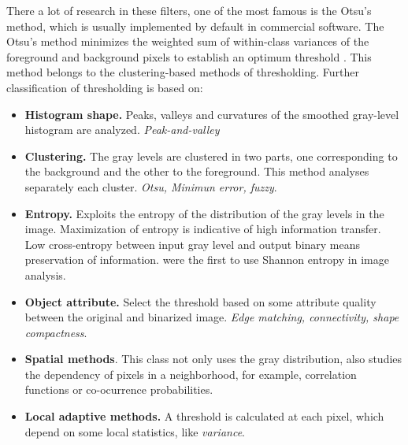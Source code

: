 There a lot of research in these filters, one of the most famous is the Otsu's
method, which is usually implemented by default in commercial software.
The Otsu's method minimizes the weighted sum of within-class variances of the
foreground and background pixels to establish an optimum threshold
\citep{sezgin_survey_2004}. This method belongs to the clustering-based methods
of thresholding. Further classification of thresholding is based on:
\begin{itemize}
  \item \textbf{Histogram shape.} Peaks, valleys and curvatures of the smoothed
  gray-level histogram are analyzed. \emph{Peak-and-valley}
  \item \textbf{Clustering.} The gray levels are clustered in two parts, one
  corresponding to the background and the other to the foreground. This method
  analyses separately each cluster. \emph{Otsu, Minimun error, fuzzy}.
  \item \textbf{Entropy.} Exploits the entropy of the distribution of the gray
  levels in the image. Maximization of entropy is indicative of high information transfer.
  Low cross-entropy between input gray level and output binary means
  preservation of information. \citet{pal_automatic_1983}
  were the first to use Shannon entropy in image analysis.
 \citep{pal_image_1988}
  \item \textbf{Object attribute.} Select the threshold based on some attribute
  quality between the original and binarized image. \emph{Edge matching, connectivity,
  shape compactness}.
  \item \textbf{Spatial methods}. This class not only uses the gray
  distribution, also studies the dependency of pixels in a neighborhood, for example, correlation
functions or co-ocurrence probabilities.
  \item \textbf{Local adaptive methods.} A threshold is calculated at each
  pixel, which depend on some local statistics, like \emph{variance}.
\end{itemize}

